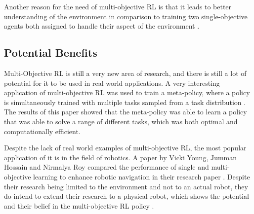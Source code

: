 Another reason for the need of multi-objective RL is that it leads to better understanding of the environment in comparison to training two single-objective agents both assigned to handle their aspect of the environment \cite{Sutton1}. %


\subsection{Potential Benefits}

Multi-Objective RL is still a very new area of research, and there is still a lot of potential for it to be used in real world applications. A very interesting application of multi-objective RL was used to train a meta-policy, where a policy is simultaneously trained with multiple tasks sampled from a task distribution \cite{8968092}. The results of this paper showed that the meta-policy was able to learn a policy that was able to solve a range of different tasks, which was both optimal and computationally efficient. 

Despite the lack of real world examples of multi-objective RL, the most popular application of it is in the field of robotics. A paper by Vicki Young, Jumman Hossain and Nirmalya Roy compared the performance of single and multi-objective learning to enhance robotic navigation in their research paper \cite{young2023enhancing}. Despite their research being limited to the environment and not to an actual robot, they do intend to extend their research to a physical robot, which shows the potential and their belief in the multi-objective RL policy \cite{young2023enhancing}.